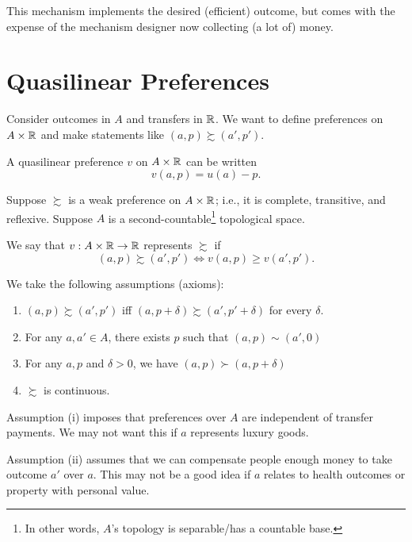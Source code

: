 This mechanism implements the desired (efficient) outcome, but comes with the expense of the mechanism designer now collecting (a lot of) money.

\section{Quasilinear Preferences}

Consider outcomes in $A$ and transfers in $\mathbb{R}$. 
We want to define preferences on $A \times \mathbb{R}$ and make statements like $(a,p) \succsim (a',p')$.

\begin{definition}
	A quasilinear preference $v$ on $A \times \mathbb{R}$ can be written \[
		v(a,p) = u(a) - p
	.\] 
\end{definition}

\begin{definition}[Represents]
	Suppose $\succsim$ is a weak preference on $A \times \mathbb{R}$; i.e., it is complete, transitive, and reflexive. Suppose $A$ is a second-countable\footnote{In other words, $A$'s topology is separable/has a countable base.} topological space.

	We say that $v: A \times \mathbb{R} \to \mathbb{R}$ represents $\succsim$ if \[
		(a,p) \succsim (a',p') \iff v(a,p) \ge v(a',p')
	.\] 
\end{definition}

We take the following assumptions (axioms):
\begin{assumption} \label{4-6-1}
	\begin{enumerate}[label = (\roman*)]
		\item $(a,p) \succsim (a',p')$ iff $(a,p+\delta) \succsim(a',p'+\delta)$ for every $\delta$.
		\item For any $a,a' \in A$, there exists $p$ such that $(a,p) \sim (a',0)$
		\item For any $a,p$ and $\delta > 0$, we have $(a,p) \succ (a,p+\delta)$
		\item $\succsim$ is continuous.
	\end{enumerate}
\end{assumption}

\begin{remark}
	Assumption (i) imposes that preferences over $A$ are independent of transfer payments. We may not want this if $a$ represents luxury goods.

	Assumption (ii) assumes that we can compensate people enough money to take outcome $a'$ over $a$. This may not be a good idea if $a$ relates to health outcomes or property with personal value.
\end{remark}

